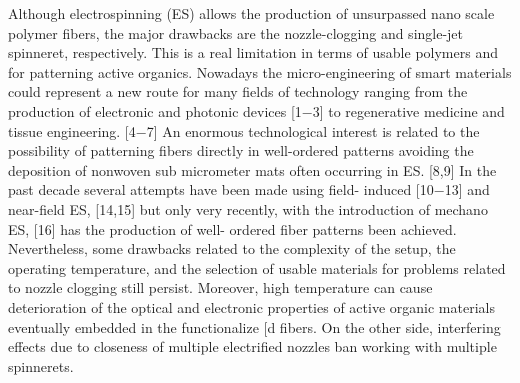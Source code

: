 \documentclass[5p,,preprint,12pt,twocolumn]{elsarticle}
\begin{document}
Although electrospinning (ES) allows the production of unsurpassed nano scale polymer fibers, the major drawbacks are the nozzle-clogging and single-jet spinneret, respectively. This is a real limitation in terms of usable polymers and for patterning active organics. Nowadays the micro-engineering of smart materials could represent a new route for many fields of technology ranging from the production of electronic and photonic devices [1\ensuremath{-}3] to regenerative medicine and tissue engineering. [4\ensuremath{-}7] An enormous technological interest is related to the possibility of patterning fibers directly in well-ordered patterns avoiding the deposition of nonwoven sub micrometer mats often occurring in ES. [8,9] In the past decade several attempts have been made using field- induced [10\ensuremath{-}13] and near-field ES, [14,15] but only very recently, with the introduction of mechano ES, [16] has the production of well- ordered fiber patterns been achieved. Nevertheless, some drawbacks related to the complexity of the setup, the operating temperature, and the selection of usable materials for problems related to nozzle clogging still persist. Moreover, high temperature can cause deterioration of the optical and electronic properties of active organic materials eventually embedded in the functionalize [d fibers. On the other side, interfering effects due to closeness of multiple electrified nozzles ban working with multiple spinnerets.
    






\end{document}
